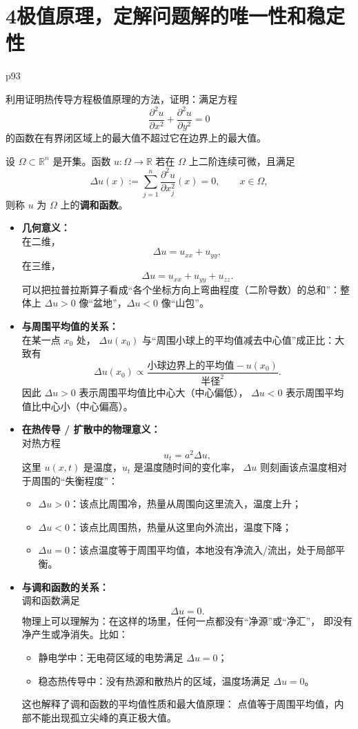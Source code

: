 \section{4极值原理，定解问题解的唯一性和稳定性}
p93
\begin{homework}[2]
利用证明热传导方程极值原理的方法，证明：满足方程
\[
\frac{\partial^2 u}{\partial x^2}+\frac{\partial^2 u}{\partial y^2}=0
\]
的函数在有界闭区域上的最大值不超过它在边界上的最大值。
\end{homework}
\begin{definition}[调和函数]
设 $\Omega\subset\mathbb R^n$ 是开集。函数 $u:\Omega\to\mathbb R$
若在 $\Omega$ 上二阶连续可微，且满足
\[
\Delta u(x)
:= \sum_{j=1}^n \frac{\partial^2 u}{\partial x_j^2}(x) = 0,
\qquad x\in\Omega,
\]
则称 $u$ 为 $\Omega$ 上的\textbf{调和函数}。
\end{definition}
\begin{itemize}
  \item \textbf{几何意义：}\\
  在二维，
  \[
    \Delta u = u_{xx} + u_{yy},
  \]
  在三维，
  \[
    \Delta u = u_{xx} + u_{yy} + u_{zz}.
  \]
  可以把拉普拉斯算子看成“各个坐标方向上弯曲程度（二阶导数）的总和”：整体上
  \(\Delta u>0\) 像“盆地”，\(\Delta u<0\) 像“山包”。

  \item \textbf{与周围平均值的关系：}\\
  在某一点 \(x_0\) 处，
  \(\Delta u(x_0)\) 与“周围小球上的平均值减去中心值”成正比：大致有
  \[
    \Delta u(x_0) \propto
    \frac{\text{小球边界上的平均值} - u(x_0)}{\text{半径}^2}.
  \]
  因此
  \(\Delta u>0\) 表示周围平均值比中心大（中心偏低），
  \(\Delta u<0\) 表示周围平均值比中心小（中心偏高）。

  \item \textbf{在热传导 / 扩散中的物理意义：}\\
  对热方程
  \[
    u_t = a^2 \Delta u,
  \]
  这里 \(u(x,t)\) 是温度，\(u_t\) 是温度随时间的变化率，
  \(\Delta u\) 则刻画该点温度相对于周围的“失衡程度”：
  \begin{itemize}
    \item \(\Delta u>0\)：该点比周围冷，热量从周围向这里流入，温度上升；
    \item \(\Delta u<0\)：该点比周围热，热量从这里向外流出，温度下降；
    \item \(\Delta u=0\)：该点温度等于周围平均值，本地没有净流入/流出，处于局部平衡。
  \end{itemize}

  \item \textbf{与调和函数的关系：}\\
  调和函数满足
  \[
    \Delta u = 0.
  \]
  物理上可以理解为：在这样的场里，任何一点都没有“净源”或“净汇”，
  即没有净产生或净消失。比如：
  \begin{itemize}
    \item 静电学中：无电荷区域的电势满足 \(\Delta u=0\)；
    \item 稳态热传导中：没有热源和散热片的区域，温度场满足 \(\Delta u=0\)。
  \end{itemize}
  这也解释了调和函数的平均值性质和最大值原理：
  点值等于周围平均值，内部不能出现孤立尖峰的真正极大值。
\end{itemize}
